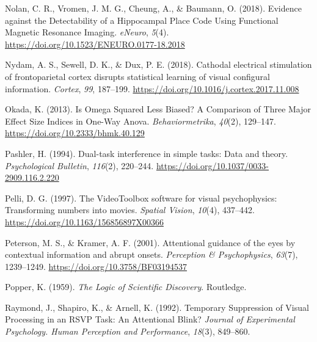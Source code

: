 \documentclass[
  man]{apa6}
\newlength{\cslhangindent}
\newlength{\cslentryspacingunit} %
\newenvironment{CSLReferences}[2] %
 {%
  \setlength{\parindent}{0pt}
  \ifodd #1
  \let\oldpar\par
  \def\par{\hangindent=\cslhangindent\oldpar}
  \fi
  \setlength{\parskip}{#2\cslentryspacingunit}
 }%
 {}
\begin{document}
\begin{CSLReferences}{1}{0}
\leavevmode{}%
Nolan, C. R., Vromen, J. M. G., Cheung, A., \& Baumann, O. (2018). Evidence against the {Detectability} of a {Hippocampal Place Code Using Functional Magnetic Resonance Imaging}. \emph{eNeuro}, \emph{5}(4). \url{https://doi.org/10.1523/ENEURO.0177-18.2018}

\leavevmode{}%
Nydam, A. S., Sewell, D. K., \& Dux, P. E. (2018). Cathodal electrical stimulation of frontoparietal cortex disrupts statistical learning of visual configural information. \emph{Cortex}, \emph{99}, 187--199. \url{https://doi.org/10.1016/j.cortex.2017.11.008}

\leavevmode{}%
Okada, K. (2013). Is {Omega Squared Less Biased}? A {Comparison} of {Three Major Effect Size Indices} in {One-Way Anova}. \emph{Behaviormetrika}, \emph{40}(2), 129--147. \url{https://doi.org/10.2333/bhmk.40.129}

\leavevmode{}%
Pashler, H. (1994). Dual-task interference in simple tasks: Data and theory. \emph{Psychological Bulletin}, \emph{116}(2), 220--244. \url{https://doi.org/10.1037/0033-2909.116.2.220}

\leavevmode{}%
Pelli, D. G. (1997). The {VideoToolbox} software for visual psychophysics: Transforming numbers into movies. \emph{Spatial Vision}, \emph{10}(4), 437--442. \url{https://doi.org/10.1163/156856897X00366}

\leavevmode{}%
Peterson, M. S., \& Kramer, A. F. (2001). Attentional guidance of the eyes by contextual information and abrupt onsets. \emph{Perception \& Psychophysics}, \emph{63}(7), 1239--1249. \url{https://doi.org/10.3758/BF03194537}

\leavevmode{}%
Popper, K. (1959). \emph{The {Logic} of {Scientific Discovery}}. {Routledge}.

\leavevmode{}%
Raymond, J., Shapiro, K., \& Arnell, K. (1992). Temporary {Suppression} of {Visual Processing} in an {RSVP Task}: {An Attentional Blink}? \emph{Journal of Experimental Psychology. Human Perception and Performance}, \emph{18}(3), 849--860.


\end{CSLReferences}
\end{document}
